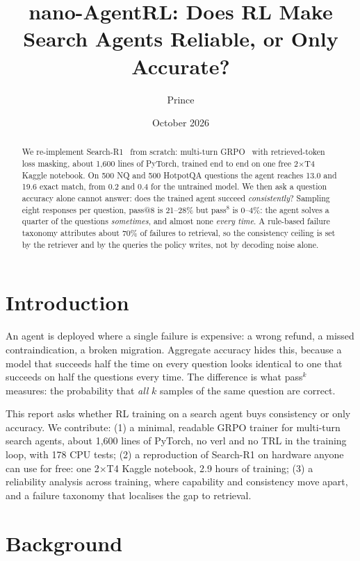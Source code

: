 \documentclass[11pt]{article}
\title{nano-AgentRL: Does RL Make Search Agents Reliable, or Only Accurate?}
\author{Prince}
\date{October 2026}
\begin{document}
\maketitle

\begin{abstract}
We re-implement Search-R1~\cite{jin2025searchr1} from scratch: multi-turn
GRPO~\cite{shao2024deepseekmath} with retrieved-token loss masking, about 1{,}600 lines of
PyTorch, trained end to end on one free 2$\times$T4 Kaggle notebook. On 500 NQ and 500
HotpotQA questions the agent reaches 13.0 and 19.6 exact match, from 0.2 and 0.4 for the
untrained model. We then ask a question accuracy alone cannot answer: does the trained agent
succeed \emph{consistently}? Sampling eight responses per question, pass@8 is 21--28\% but
pass$^8$ is 0--4\%: the agent solves a quarter of the questions \emph{sometimes}, and almost
none \emph{every time}. A rule-based failure taxonomy attributes about 70\% of failures to
retrieval, so the consistency ceiling is set by the retriever and by the queries the policy
writes, not by decoding noise alone.
\end{abstract}

\section{Introduction}
An agent is deployed where a single failure is expensive: a wrong refund, a missed
contraindication, a broken migration. Aggregate accuracy hides this, because a model that
succeeds half the time on every question looks identical to one that succeeds on half the
questions every time. The difference is what pass$^k$~\cite{yao2024taubench} measures: the
probability that \emph{all} $k$ samples of the same question are correct.

This report asks whether RL training on a search agent buys consistency or only accuracy.
We contribute:
(1) a minimal, readable GRPO trainer for multi-turn search agents, about 1{,}600 lines of
PyTorch, no verl and no TRL in the training loop, with 178 CPU tests;
(2) a reproduction of Search-R1 on hardware anyone can use for free: one 2$\times$T4 Kaggle
notebook, 2.9 hours of training;
(3) a reliability analysis across training, where capability and consistency move apart, and
a failure taxonomy that localises the gap to retrieval.

\section{Background}
\end{document}
